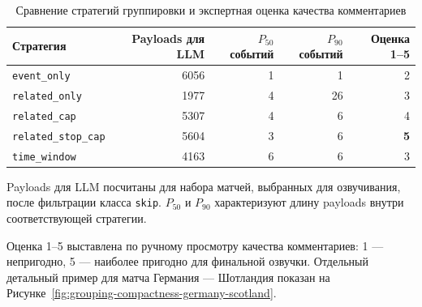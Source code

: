 \begin{table}[H]
\centering
\small
\caption{Сравнение стратегий группировки и экспертная оценка качества комментариев}
\label{tab:llm-strategy-quality}
\begin{threeparttable}
\begin{tabular}{lrrrr}
\toprule
\textbf{Стратегия} & \textbf{Payloads для LLM} & \textbf{$P_{50}$ событий} & \textbf{$P_{90}$ событий} & \textbf{Оценка 1--5} \\
\midrule
\texttt{event\_only} & 6056 & 1 & 1 & 2 \\
\texttt{related\_only} & 1977 & 4 & 26 & 3 \\
\texttt{related\_cap} & 5307 & 4 & 6 & 4 \\
\texttt{related\_stop\_cap} & 5604 & 3 & 6 & \textbf{5} \\
\texttt{time\_window} & 4163 & 6 & 6 & 3 \\
\bottomrule
\end{tabular}
\begin{tablenotes}\footnotesize
\item Payloads для LLM посчитаны для набора матчей, выбранных для озвучивания, после фильтрации класса \texttt{skip}. $P_{50}$ и $P_{90}$ характеризуют длину payloads внутри соответствующей стратегии.
\item Оценка 1--5 выставлена по ручному просмотру качества комментариев: 1 --- непригодно, 5 --- наиболее пригодно для финальной озвучки. Отдельный детальный пример для матча Германия --- Шотландия показан на Рисунке~\ref{fig:grouping-compactness-germany-scotland}.
\end{tablenotes}
\end{threeparttable}
\end{table}
